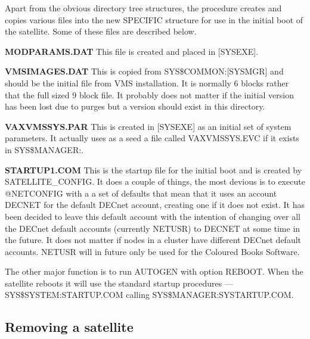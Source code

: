Apart from the obvious directory tree structures, the procedure creates and
copies various files into the new SPECIFIC structure for use in the initial
boot of the satellite.
Some of these files are described below.

\begin {description}

\item {\bf MODPARAMS.DAT} This file is created and placed in [SYSEXE].

\item {\bf VMSIMAGES.DAT} This is copied from SYS\$COMMON:[SYSMGR] and should be
the initial file from VMS installation.
It is normally 6 blocks rather that the full sized 9 block file.
It probably does not matter if the initial version has been lost due to
purges but a version should exist in this directory.

\item {\bf VAXVMSSYS.PAR} This is created in [SYSEXE] as an initial set of system
parameters.
It actually uses as a seed a file called VAXVMSSYS.EVC if it exists in
SYS\$MANAGER:.

\item {\bf STARTUP1.COM} This is the startup file for the initial boot and is
created by SATELLITE\_CONFIG.
It does a couple of things, the most devious is to execute @NETCONFIG with a
a set of defaults that mean that it uses an account DECNET for the default
DECnet account, creating one if it does not exist.
It has been decided to leave this default account with the intention of
changing over all the DECnet default accounts (currently NETUSR) to DECNET
at some time in the future.
It does not matter if nodes in a cluster have different DECnet default accounts.
NETUSR will in future only be used for the Coloured Books Software.

\begin{sloppypar}
The other major function is to run AUTOGEN with option REBOOT.
When the satellite reboots it will use the standard startup procedures ---
SYS\$SYSTEM:STARTUP.COM call\-ing SYS\$MANAGER:SYSTARTUP.COM.
\end{sloppypar}

\end {description}

\subsection {Removing a satellite}


